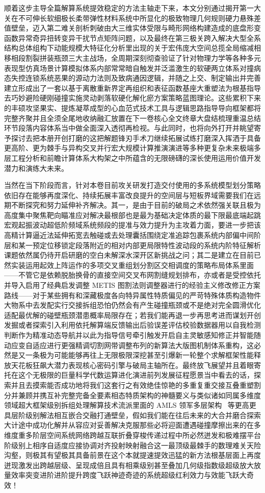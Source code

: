 顺着这步主导全篇解算系统提效稳定的方法主轴走下来，本文分别通过揭开第一大关在不可伸长软细极长柔带弹性材料系统中所显化的极致物理几何规则硬力悬殊差值壁垒，迈入第二难关剖析刺破由大三维实体受限与畸形网络构建造成的底盘形变函数异常奇异扭转变异干扰节点矩阵问题，以及最终在第三极关跨入解决大型全系结构总体组构下动能规模大特征化分析里出现的关于宏伟庞大空间总揽全局缩减相移相段割裂拼装瓶颈三大主战场，全周期深刻彻查验证了针对物理力学等各种多元表现型仿真场景计算模拟体系内部常常暗自触发并泛滥激生的软硬两立体系对撞病态失控连锁系统恶果的源动力法则及致病通因逻辑，并随之上交、制定输出并完善建立形成出了一套以基于离散重新界定再组织和表征函数基座大重塑法为根基指导去巧妙避险硬刚碰撞实施灵动剥落软硬化解化瘀方案策略蓝图理论。这些累积下来的丰硕攻坚果实、提炼凝萃成型的心血范式技术工具与逻辑思路指导导向框架都将完整齐聚并且全须全尾地收纳融汇放置在下一卷核心全文终章大盘结梳理重温总结环节段落内容体系当中做全面深入透彻再检视。与此同时，也将向外打开并眺望寄予探讨去把本册开创打磨的这把解题锋刃手术刀继续拓展试练打磨深入挥洒于具备更高阶、更为棘手与异构交叉并行宏大规模计算推演演进等多种更复杂未来极端多层工程分析和前瞻计算体系大构架之中所蕴含的无限磅礴的深长使用运用价值开发潜力和演练大未来。

当然在当下阶段而言，针对本卷目前攻关研发打造交付使用的多系统模型划分策略依旧存在能够再度深化、持续拓展丰富改良提升的空间层与短板界域需要我们在远期不断探究和努力延伸补齐解决。其一，是由于目前的破局之术依然强关联且极为高度集中聚焦靶向瞄准应对解决最根部也是最为基础决定体质的最下限最底端起跳宏观起振波动超低阶频域系统频段的提准与效力提升为主攻着力面，要进一步把该高精计算逼近法延伸拓宽去触碰或去处理囊括围绕定准追踪包裹系统内部偏中间阶层和某一预定位移锁定段落附近的相对内部更局限特性波动段的系统内阶特征解析课题依然属仍待开启研磨的空白未解深水深开区新挑战之问；其二是建立在目前已然实装运用起效上阵运作的多项交叉重组划分割区交相调度的策略布局体系里面——不管它是依赖脱胎换骨的直接空间交叉布网割缝规划排布，亦或者是受控依托并导入启用了经典启发调整 METIS 图割法则调整器进行的经验主义修改修正方案路线——对于某些拥有和深藏极度各向特异属性特质偏见的严苛特殊体质构造物件大物系中去发配实行交接拆组恐怕仍然会有产生碰撞瓶颈或不是绝对完全圆滑优化适配最优解的碰壁瓶颈潜患概率局限存在；若我们能再退一步再思考进而谋划开创发掘或者探索引入利用依托解算端反馈输出后验误差评估校验数据器用以自我检测判断作为精准动态导航并以此为指导信号牵引触发开启自主灵敏感知修正并智能随动应变自适应进行更强精调切割网带调整布列的新算法大版图机制体系重构，这必然是又一条极为可能能够再往上无限极限深挖甚至引爆新一轮整个求解框架性能释放天花板狂飙大潜力表现核心密码引擎与破局主轴所在。最终放飞展望并且着眼寄托在这个无极限的巨量科学代数运算进化演进前列发展征程愿景当中看去的话，探索并且去摸索能否成功地将我们这套行之有效绝佳惊艳的多重复重交接互叠重塑割分并兼顾并携互补完整完备全要素相态特质架构的神髓要义与类似诸如同属多维度领域超大框架级别拆组处理解算技术流派里面的 AMLS 领军多层架构~\cite{Bennighof2004AMLS} 等更高更具层阶级别解法相互嵌合交融打通壁垒，假如我们能在往后未来的大合并磨合探索大计途中成功化解并从容应对妥善解决克服那些必将迎面遭遇碰撞摩擦出来的在多维度重多阶层空间系统网络跨越互联折叠穿梭传递过程中所必然迸发和极难摆平台阶级别上相序自适度应接协调对齐投射映射融合这一最顶级最棘手的数理难关天险沟壑，则极其有望极其具备前景在这个本就提速提效迅猛的新方法根基层面上再度迸现激发出跨越层级、呈现成倍且具有相乘级别甚至叠加几何级指数级超级放大放量效率突变进阶进阶提升跨度飞跃神迹奇迹的系统超级红利效力与效能飞跃大奇效！